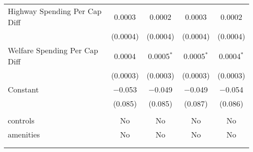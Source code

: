 \begin{table}[!htbp]
\begin{tabular}{@{\extracolsep{5pt}}lcccc}
  Highway Spending Per Cap Diff & 0.0003 & 0.0002 & 0.0003 & 0.0002 \\ 
  & (0.0004) & (0.0004) & (0.0004) & (0.0004) \\ 
  Welfare Spending Per Cap Diff & 0.0004 & 0.0005$^{*}$ & 0.0005$^{*}$ & 0.0004$^{*}$ \\ 
  & (0.0003) & (0.0003) & (0.0003) & (0.0003) \\ 
  Constant & $-$0.053 & $-$0.049 & $-$0.049 & $-$0.054 \\ 
  & (0.085) & (0.085) & (0.087) & (0.086) \\ 
 \hline \\[-1.8ex] 
controls & No & No & No & No \\ 
amenities & No & No & No & No \\ 
\hline \\[-1.8ex] 
\hline 
\hline \\[-1.8ex] 
\end{tabular} 
\end{table} 

